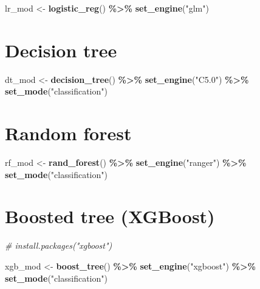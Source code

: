 \documentclass[
]{book}
\newenvironment{Shaded}{\begin{snugshade}}{\end{snugshade}}
\newcommand{\CommentTok}[1]{\textcolor[rgb]{0.56,0.35,0.01}{\textit{#1}}}
\newcommand{\KeywordTok}[1]{\textcolor[rgb]{0.13,0.29,0.53}{\textbf{#1}}}
\newcommand{\NormalTok}[1]{#1}
\newcommand{\OperatorTok}[1]{\textcolor[rgb]{0.81,0.36,0.00}{\textbf{#1}}}
\newcommand{\StringTok}[1]{\textcolor[rgb]{0.31,0.60,0.02}{#1}}
\begin{document}
\begin{Shaded}
\begin{Highlighting}[]
\NormalTok{lr\_mod \textless{}{-}}
\StringTok{  }\KeywordTok{logistic\_reg}\NormalTok{() }\OperatorTok{\%\textgreater{}\%}
\StringTok{  }\KeywordTok{set\_engine}\NormalTok{(}\StringTok{"glm"}\NormalTok{)}
\end{Highlighting}
\end{Shaded}

\hypertarget{decision-tree}{%
\section{Decision tree}\label{decision-tree}}

\begin{Shaded}
\begin{Highlighting}[]
\NormalTok{dt\_mod \textless{}{-}}
\StringTok{  }\KeywordTok{decision\_tree}\NormalTok{() }\OperatorTok{\%\textgreater{}\%}
\StringTok{  }\KeywordTok{set\_engine}\NormalTok{(}\StringTok{"C5.0"}\NormalTok{) }\OperatorTok{\%\textgreater{}\%}
\StringTok{  }\KeywordTok{set\_mode}\NormalTok{(}\StringTok{"classification"}\NormalTok{)}
\end{Highlighting}
\end{Shaded}

\hypertarget{random-forest}{%
\section{Random forest}\label{random-forest}}

\begin{Shaded}
\begin{Highlighting}[]
\NormalTok{rf\_mod \textless{}{-}}
\StringTok{  }\KeywordTok{rand\_forest}\NormalTok{() }\OperatorTok{\%\textgreater{}\%}
\StringTok{  }\KeywordTok{set\_engine}\NormalTok{(}\StringTok{"ranger"}\NormalTok{) }\OperatorTok{\%\textgreater{}\%}
\StringTok{  }\KeywordTok{set\_mode}\NormalTok{(}\StringTok{"classification"}\NormalTok{)}
\end{Highlighting}
\end{Shaded}

\hypertarget{boosted-tree-xgboost}{%
\section{Boosted tree (XGBoost)}\label{boosted-tree-xgboost}}

\begin{Shaded}
\begin{Highlighting}[]
\CommentTok{\# install.packages("xgboost")}

\NormalTok{xgb\_mod \textless{}{-}}
\StringTok{  }\KeywordTok{boost\_tree}\NormalTok{() }\OperatorTok{\%\textgreater{}\%}
\StringTok{  }\KeywordTok{set\_engine}\NormalTok{(}\StringTok{"xgboost"}\NormalTok{) }\OperatorTok{\%\textgreater{}\%}
\StringTok{  }\KeywordTok{set\_mode}\NormalTok{(}\StringTok{"classification"}\NormalTok{)}
\end{Highlighting}
\end{Shaded}
\end{document}
